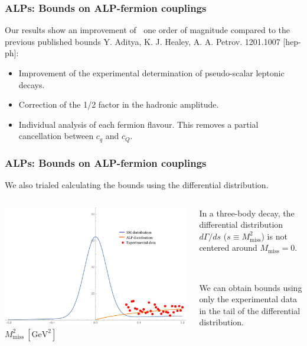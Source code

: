 \documentclass[mathserif, 10pt, dvipsnames]{beamer}
\newcommand\colorcite[1]{{\scriptsize\color{unizarblue}#1}}
\begin{document}
\begin{frame}\frametitle{ALPs: Bounds on ALP-fermion couplings}
Our results show an improvement of $~$ one order of magnitude compared to the previous published bounds \colorcite{Y. Aditya, K. J. Healey, A. A. Petrov. 1201.1007 [hep-ph]}:
    \begin{itemize}
        \item Improvement of the experimental determination of pseudo-scalar leptonic decays.
        \item Correction of the 1/2 factor in the hadronic amplitude.
        \item Individual analysis of each fermion flavour. This removes a partial cancellation between $c_q$ and $c_Q$.
    \end{itemize}
\end{frame}

\begin{frame}
    \frametitle{ALPs: Bounds on ALP-fermion couplings}
    We also trialed calculating the bounds using the differential distribution.
    \begin{columns}
        \begin{column}{0.6\textwidth}
            \center
            \includegraphics[width=\columnwidth]{figures/distr}
            {\small $M_\mathrm{miss}^2\ [\mathrm{GeV}^2]$}
        \end{column}
        \begin{column}{0.4\textwidth}
            In a three-body decay, the differential distribution $d\Gamma/d s$ ($s \equiv M_\mathrm{miss}^2$) is not centered around $M_\mathrm{miss}=0$.

            ~

            We can obtain bounds using only the experimental data in the tail of the differential distribution.
        \end{column}
    \end{columns}
\end{frame}
\end{document}
